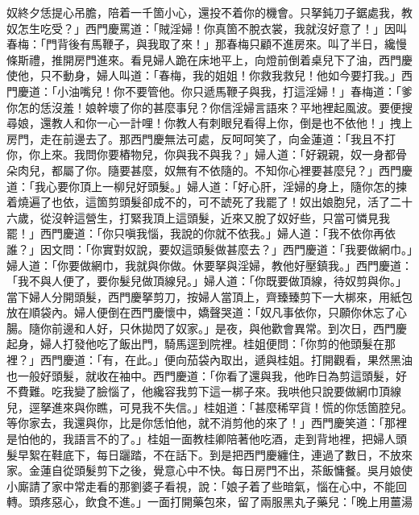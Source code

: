 奴終夕恁提心吊膽，陪着一千箇小心，還投不着你的機會。只拏鈍刀子鋸處我，教奴怎生吃受？」西門慶罵道：「賊淫婦！你真箇不脫衣裳，我就沒好意了！」因叫春梅：「門背後有馬鞭子，與我取了來！」那春梅只顧不進房來。叫了半日，纔慢條斯禮，推開房門進來。看見婦人跪在床地平上，向燈前倒着桌兒下了油，西門慶使他，只不動身，婦人叫道：「春梅，我的姐姐！你救我救兒！他如今要打我。」西門慶道：「小油嘴兒！你不要管他。你只遞馬鞭子與我，打這淫婦！」春梅道：「爹你怎的恁沒羞！娘幹壞了你的甚麼事兒？你信淫婦言語來？平地裡起風波。要便搜尋娘，還教人和你一心一計哩！你教人有刺眼兒看得上你，倒是也不依他！」拽上房門，走在前邊去了。那西門慶無法可處，反呵呵笑了，向金蓮道：「我且不打你，你上來。我問你要樁物兒，你與我不與我？」婦人道：「好親親，奴一身都骨朵肉兒，都屬了你。隨要甚麼，奴無有不依隨的。不知你心裡要甚麼兒？」西門慶道：「我心要你頂上一柳兒好頭髮。」婦人道：「好心肝，淫婦的身上，隨你怎的揀着燒遍了也依，這箇剪頭髮卻成不的，可不諕死了我罷了！奴出娘胞兒，活了二十六歲，從沒幹這營生，打緊我頂上這頭髮，近來又脫了奴好些，只當可憐見我罷！」西門慶道：「你只嗔我惱，我說的你就不依我。」婦人道：「我不依你再依誰？」因文問：「你實對奴說，要奴這頭髮做甚麼去？」西門慶道：「我要做網巾。」婦人道：「你要做網巾，我就與你做。休要拏與淫婦，教他好壓鎮我。」西門慶道：「我不與人便了，要你髮兒做頂線兒。」婦人道：「你既要做頂線，待奴剪與你。」當下婦人分開頭髮，西門慶拏剪刀，按婦人當頂上，齊臻臻剪下一大梆來，用紙包放在順袋內。婦人便倒在西門慶懷中，嬌聲哭道：「奴凡事依你，只願你休忘了心腸。隨你前邊和人好，只休拋閃了奴家。」是夜，與他歡會異常。到次日，西門慶起身，婦人打發他吃了飯出門，騎馬逕到院裡。桂姐便問：「你剪的他頭髮在那裡？」西門慶道：「有，在此。」便向茄袋內取出，遞與桂姐。打開觀看，果然黑油也一般好頭髮，就收在袖中。西門慶道：「你看了還與我，他昨日為剪這頭髮，好不費難。吃我變了臉惱了，他纔容我剪下這一梆子來。我哄他只說要做網巾頂線兒，逕拏進來與你瞧，可見我不失信。」桂姐道：「甚麼稀罕貨！慌的你恁箇腔兒。等你家去，我還與你，比是你恁怕他，就不消剪他的來了！」西門慶笑道：「那裡是怕他的，我語言不的了。」桂姐一面教桂卿陪著他吃酒，走到背地裡，把婦人頭髮早絮在鞋底下，每日躧踏，不在話下。到是把西門慶纏住，連過了數日，不放來家。金蓮自從頭髮剪下之後，覺意心中不快。每日房門不出，茶飯慵餐。吳月娘使小廝請了家中常走看的那劉婆子看視，說：「娘子着了些暗氣，惱在心中，不能回轉。頭疼惡心，飲食不進。」一面打開藥包來，留了兩服黑丸子藥兒：「晚上用薑湯 